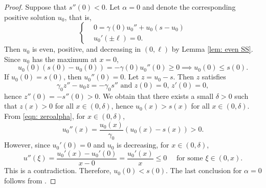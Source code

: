 \documentclass{article}
\begin{document}
\begin{proof}
Suppose that $s''(0)<0$.
    Let $\alpha =0$ and denote the corresponding positive solution $u_0$, that is, 
    \begin{equation}\label{eqn: zeroalpha}
    \left\{\begin{aligned}
        &0 = \gamma(0)u_{0}'' + u_{0} (s - u_{0})\\
        & u_{0}'(\pm \ell) =0.
    \end{aligned}\right.
\end{equation} Then $u_{0}$ is even, positive, and decreasing in $(0,\ell)$ by Lemma \ref{lem: even SS}. Since $u_{0}$ has the maximum at $x=0$, 
\[u_{0}(0)(s(0)-u_{0}(0)) = -\gamma(0)u_{0}''(0)\ge 0 \implies u_{0}(0)\le s(0) .\] If $u_0(0)=s(0)$, then $u_0''(0)=0$. 
Let $z=u_0-s$. 
Then $z$ satisfies $$\gamma_0z''-u_0z=-\gamma_0s'' \text{ and } z(0)=0,\,z'(0)=0,$$ hence $z''(0) = -s''(0)>0$. We obtain that there exists a small $\delta>0$ such that $z(x)>0$ for all $x\in(0,\delta)$, hence $u_0(x)>s(x)$ for all $x\in(0,\delta)$. From \eqref{eqn: zeroalpha}, for $x\in(0,\delta)$, 
$$u_0''(x) = \frac{u_0(x)}{\gamma_0}(u_0(x)-s(x))>0.$$ However, since $u_0'(0)=0$ and $u_0$ is decreasing, for $x\in (0,\delta)$, $$u''(\xi) = \frac{u_0'(x)-u_0'(0)}{x-0}=\frac{u_0'(x)}{x}\le 0 \quad \text{ for some } \xi\in(0,x).$$ This is a contradiction. Therefore, $u_0(0)<s(0)$.
 The last conclusion for $\alpha=0$ follows from \cite[Theorem 1.2]{Lou2006}. 
 

\end{proof}
\end{document}
